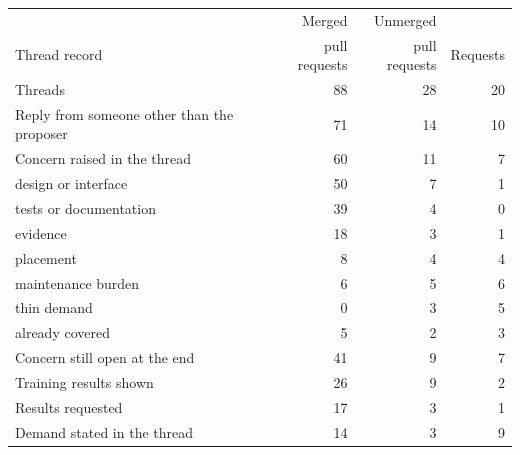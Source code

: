 \begin{tabular}{lrrr}
\toprule
 & Merged & Unmerged & \\
Thread record & pull requests & pull requests & Requests \\
\midrule
Threads & 88 & 28 & 20 \\
\addlinespace
Reply from someone other than the proposer & 71 & 14 & 10 \\
Concern raised in the thread & 60 & 11 & 7 \\
\quad design or interface & 50 & 7 & 1 \\
\quad tests or documentation & 39 & 4 & 0 \\
\quad evidence & 18 & 3 & 1 \\
\quad placement & 8 & 4 & 4 \\
\quad maintenance burden & 6 & 5 & 6 \\
\quad thin demand & 0 & 3 & 5 \\
\quad already covered & 5 & 2 & 3 \\
Concern still open at the end & 41 & 9 & 7 \\
Training results shown & 26 & 9 & 2 \\
Results requested & 17 & 3 & 1 \\
Demand stated in the thread & 14 & 3 & 9 \\
\bottomrule
\end{tabular}
